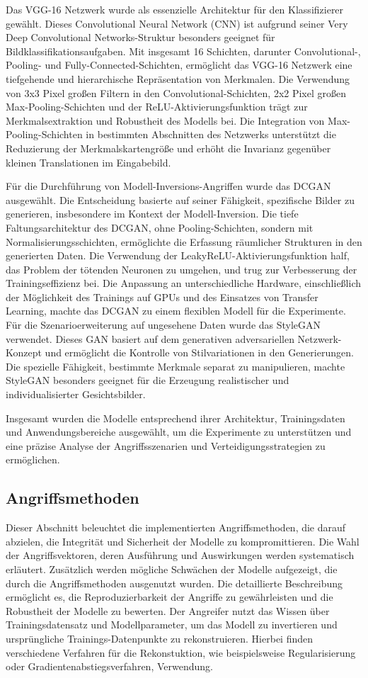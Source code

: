 Das VGG-16 Netzwerk wurde als essenzielle Architektur für den Klassifizierer gewählt. Dieses Convolutional Neural Network (CNN) ist aufgrund seiner \glqq Very Deep Convolutional Networks\grqq-Struktur besonders geeignet für Bildklassifikationsaufgaben. Mit insgesamt 16 Schichten, darunter Convolutional-, Pooling- und Fully-Connected-Schichten, ermöglicht das VGG-16 Netzwerk eine tiefgehende und hierarchische Repräsentation von Merkmalen. Die Verwendung von 3x3 Pixel großen Filtern in den Convolutional-Schichten, 2x2 Pixel großen Max-Pooling-Schichten und der ReLU-Aktivierungsfunktion trägt zur Merkmalsextraktion und Robustheit des Modells bei. Die Integration von Max-Pooling-Schichten in bestimmten Abschnitten des Netzwerks unterstützt die Reduzierung der Merkmalskartengröße und erhöht die Invarianz gegenüber kleinen Translationen im Eingabebild.

Für die Durchführung von Modell-Inversions-Angriffen wurde das DCGAN ausgewählt. Die Entscheidung basierte auf seiner Fähigkeit, spezifische Bilder zu generieren, insbesondere im Kontext der Modell-Inversion. Die tiefe Faltungsarchitektur des DCGAN, ohne Pooling-Schichten, sondern mit Normalisierungsschichten, ermöglichte die Erfassung räumlicher Strukturen in den generierten Daten. Die Verwendung der LeakyReLU-Aktivierungsfunktion half, das Problem der \glqq tötenden Neuronen\grqq{} zu umgehen, und trug zur Verbesserung der Trainingseffizienz bei. Die Anpassung an unterschiedliche Hardware, einschließlich der Möglichkeit des Trainings auf GPUs und des Einsatzes von Transfer Learning, machte das DCGAN zu einem flexiblen Modell für die Experimente. Für die Szenarioerweiterung auf ungesehene Daten wurde das StyleGAN verwendet. Dieses GAN basiert auf dem generativen adversariellen Netzwerk-Konzept und ermöglicht die Kontrolle von Stilvariationen in den Generierungen. Die spezielle Fähigkeit, bestimmte Merkmale separat zu manipulieren, machte StyleGAN besonders geeignet für die Erzeugung realistischer und individualisierter Gesichtsbilder.

Insgesamt wurden die Modelle entsprechend ihrer Architektur, Trainingsdaten und Anwendungsbereiche ausgewählt, um die Experimente zu unterstützen und eine präzise Analyse der Angriffsszenarien und Verteidigungsstrategien zu ermöglichen.
\subsection{Angriffsmethoden}
Dieser Abschnitt beleuchtet die implementierten Angriffsmethoden, die darauf abzielen, die Integrität und Sicherheit der Modelle zu kompromittieren. Die Wahl der Angriffsvektoren, deren Ausführung und Auswirkungen werden systematisch erläutert. Zusätzlich werden mögliche Schwächen der Modelle aufgezeigt, die durch die Angriffsmethoden ausgenutzt wurden. Die detaillierte Beschreibung ermöglicht es, die Reproduzierbarkeit der Angriffe zu gewährleisten und die Robustheit der Modelle zu bewerten. Der Angreifer nutzt das Wissen über Trainingsdatensatz und Modellparameter, um das Modell zu invertieren und ursprüngliche Trainings-Datenpunkte zu rekonstruieren. Hierbei finden verschiedene Verfahren für die Rekonstuktion, wie beispielsweise Regularisierung oder Gradientenabstiegsverfahren, Verwendung.

